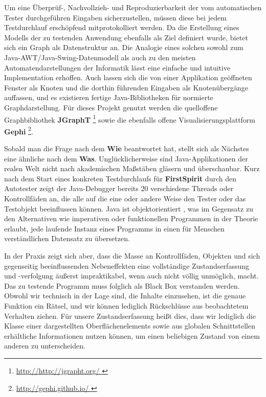 Um eine Überprüf-, Nachvollzieh- und Reproduzierbarkeit der vom automatischen Tester
durchgeführen Eingaben sicherzustellen, müssen diese bei jedem Testdurchlauf erschöpfend
mitprotokolliert werden. Da die Erstellung eines Modells der zu testenden Anwendung 
ebenfalls als Ziel definiert wurde, bietet sich ein Graph als Datenstruktur an. Die Analogie
eines solchen sowohl zum Java-AWT/Java-Swing-Datenmodell als auch zu den meisten 
Automatendarstellungen der Informatik lässt eine einfache und intuitive Implementation
erhoffen. Auch lassen sich die von einer Applikation geöffneten Fenster als Knoten und die
dorthin führenden Eingaben als Knotenübergänge auffassen, und es existieren
fertige Java-Bibliotheken für normierte Graphdarstellung. Für dieses Projekt genutzt
werden die quelloffene Graphbibliothek \textbf{JGraphT} \footnote{\url{ http://http://jgrapht.org/ }} sowie die
ebenfalls offene Visualisierungsplattform \textbf{Gephi} \footnote{\url{ http://gephi.github.io/ }}.

Sobald man die Frage nach dem \textbf{Wie} beantwortet hat, stellt sich als Nächstes
eine ähnliche nach dem \textbf{Was}. Unglücklicherweise sind Java-Applikationen der realen
Welt nicht nach akademischen Maßstäben gläsern und überschaubar. Kurz nach dem
Start eines konkreten Testdurchlaufs für \textbf{FirstSpirit} durch den Autotester zeigt der
Java-Debugger bereits 20 verschiedene Threads oder Kontrollfäden an, die alle auf
die eine oder andere Weise den Tester oder das Testobjekt beeinflussen können.
Java ist objektorientiert \cite{java7insel}, was im Gegensatz zu den Alternativen 
wie imperativen oder funktionellen Programmen in der Theorie erlaubt, jede laufende 
Instanz eines Programms in einen für Menschen verständlichen Datensatz zu übersetzen.

In der Praxis zeigt sich aber, dass die Masse an Kontrollfäden, Objekten und
sich gegenseitig beeinflussenden Nebeneffekten eine vollständige Zustandserfassung
und -verfolgung äußerst impraktikabel, wenn auch nicht völlig unmöglich, macht.
Das zu testende Programm muss folglich als \glqq{}Black Box\grqq{} verstanden werden.
Obwohl wir technisch in der Lage sind, die Inhalte einzusehen, ist die genaue
Funktion ein Rätsel, und wir können lediglich Rückschlüsse aus beobachtetem
Verhalten ziehen. Für unsere Zustandserfassung heißt dies, dass wir lediglich
die Klasse einer dargestellten Oberflächenelements sowie aus globalen
Schnittstellen erhältliche Informationen nutzen können, um einen beliebigen Zustand
von einem anderen zu unterscheiden. 

